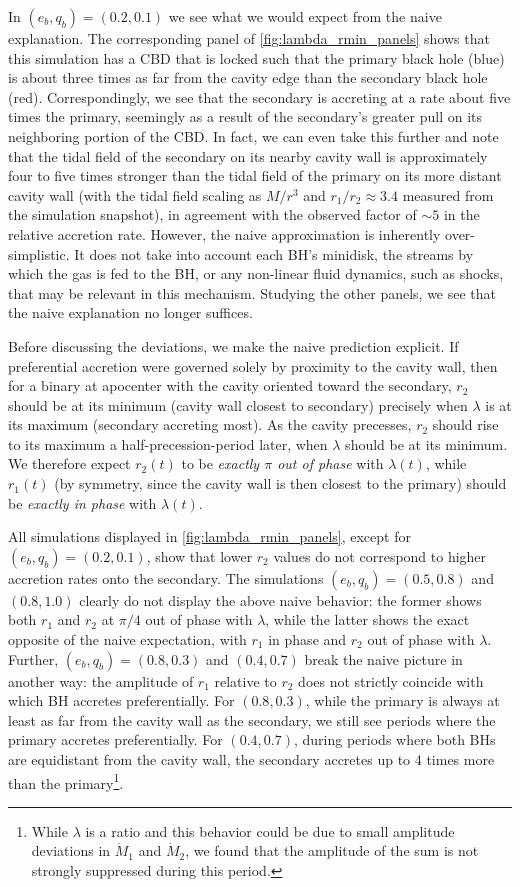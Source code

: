\documentclass[fleqn,usenatbib]{mnras}
\begin{document}
In $(e_b, q_b) = (0.2, 0.1)$ we see what we would expect from the naive explanation. The corresponding panel of \autoref{fig:lambda_rmin_panels} shows that this simulation has a CBD that is locked such that the primary black hole (blue) is about three times as far from the cavity edge than the secondary black hole (red). Correspondingly, we see that the secondary is accreting at a rate about five times the primary, seemingly as a result of the secondary's greater pull on its neighboring portion of the CBD. In fact, we can even take this further and note that the tidal field of the secondary on its nearby cavity wall is approximately four to five times stronger than the tidal field of the primary on its more distant cavity wall (with the tidal field scaling as $M/r^3$ and $r_1/r_2 \approx 3.4$ measured from the simulation snapshot), in agreement with the observed factor of $\sim 5$ in the relative accretion rate. However, the naive approximation is inherently over-simplistic. It does not take into account each BH's minidisk, the streams by which the gas is fed to the BH, or any non-linear fluid dynamics, such as shocks, that may be relevant in this mechanism. Studying the other panels, we see that the naive explanation no longer suffices.

Before discussing the deviations, we make the naive prediction explicit. If preferential accretion were governed solely by proximity to the cavity wall, then for a binary at apocenter with the cavity oriented toward the secondary, $r_2$ should be at its minimum (cavity wall closest to secondary) precisely when $\lambda$ is at its maximum (secondary accreting most). As the cavity precesses, $r_2$ should rise to its maximum a half-precession-period later, when $\lambda$ should be at its minimum. We therefore expect $r_2(t)$ to be \textit{exactly $\pi$ out of phase} with $\lambda(t)$, while $r_1(t)$ (by symmetry, since the cavity wall is then closest to the primary) should be \textit{exactly in phase} with $\lambda(t)$.

All simulations displayed in \autoref{fig:lambda_rmin_panels}, except for $(e_b, q_b) = (0.2, 0.1)$, show that lower $r_2$ values do not correspond to higher accretion rates onto the secondary. The simulations $(e_b, q_b) = (0.5, 0.8)$ and $(0.8, 1.0)$ clearly do not display the above naive behavior: the former shows both $r_1$ and $r_2$ at $\pi/4$ out of phase with $\lambda$, while the latter shows the exact opposite of the naive expectation, with $r_1$ in phase and $r_2$ out of phase with $\lambda$. Further, $(e_b, q_b) = (0.8, 0.3)$ and $(0.4, 0.7)$ break the naive picture in another way: the amplitude of $r_1$ relative to $r_2$ does not strictly coincide with which BH accretes preferentially. For $(0.8, 0.3)$, while the primary is always at least as far from the cavity wall as the secondary, we still see periods where the primary accretes preferentially. For $(0.4, 0.7)$, during periods where both BHs are equidistant from the cavity wall, the secondary accretes up to 4 times more than the primary\footnote{While $\lambda$ is a ratio and this behavior could be due to small amplitude deviations in $\dot{M}_1$ and $\dot{M}_2$, we found that the amplitude of the sum is not strongly suppressed during this period.}.
\end{document}
